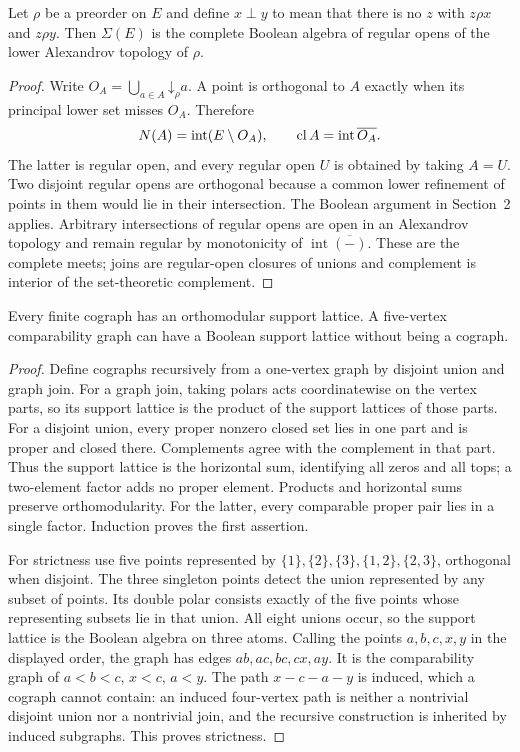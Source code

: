 \begin{proposition}\label{prop:regular-open}
Let $\rho$ be a preorder on $E$ and define $x\perp y$ to mean that
there is no $z$ with $z\rho x$ and $z\rho y$. Then $\Sigma(E)$
is the complete Boolean algebra of regular opens of the lower
Alexandrov topology of $\rho$.
\end{proposition}
\begin{proof}
Write $O_A=\bigcup_{a\in A}\mathord\downarrow_\rho a$.
A point is orthogonal to $A$ exactly when its principal lower set
misses $O_A$. Therefore
\[
 N(A)=\operatorname{int}(E\setminus O_A),\qquad
 \operatorname{cl} A=\operatorname{int}\overline{O_A}.
\]
The latter is regular open, and every regular open $U$ is obtained
by taking $A=U$. Two disjoint regular opens are orthogonal because
a common lower refinement of points in them would lie in their
intersection. The Boolean argument in Section~2 applies.
Arbitrary intersections of regular opens are open in an Alexandrov
topology and remain regular by monotonicity of
$\operatorname{int}\overline{(-)}$. These are the complete meets;
joins are regular-open closures of unions and complement is
interior of the set-theoretic complement.
\end{proof}

\begin{proposition}
\label{prop:cographs}
Every finite cograph has an orthomodular support lattice. A
five-vertex comparability graph can have a Boolean support lattice
without being a cograph.
\end{proposition}
\begin{proof}
Define cographs recursively from a one-vertex graph by disjoint
union and graph join. For a graph join, taking polars acts
coordinatewise on the vertex parts, so its support lattice is the
product of the support lattices of those parts. For a disjoint
union, every proper nonzero closed set lies in one part and is
proper and closed there. Complements agree with the complement
in that part. Thus the support lattice is the horizontal sum,
identifying all zeros and all tops; a two-element factor adds no
proper element. Products and horizontal sums preserve
orthomodularity. For the latter, every comparable proper pair
lies in a single factor. Induction proves the first assertion.

For strictness use five points represented by
$\{1\},\{2\},\{3\},\{1,2\},\{2,3\}$, orthogonal when
disjoint. The three singleton points detect the union represented
by any subset of points. Its double polar consists exactly of
the five points whose representing subsets lie in that union.
All eight unions occur, so the support lattice is the Boolean
algebra on three atoms. Calling the points $a,b,c,x,y$ in the
displayed order, the graph has edges $ab,ac,bc,cx,ay$.
It is the comparability graph of $a<b<c$, $x<c$, $a<y$.
The path $x-c-a-y$ is induced, which a cograph cannot contain:
an induced four-vertex path is neither a nontrivial disjoint union nor a
nontrivial join, and the recursive construction is inherited by induced
subgraphs. This proves strictness.
\end{proof}

